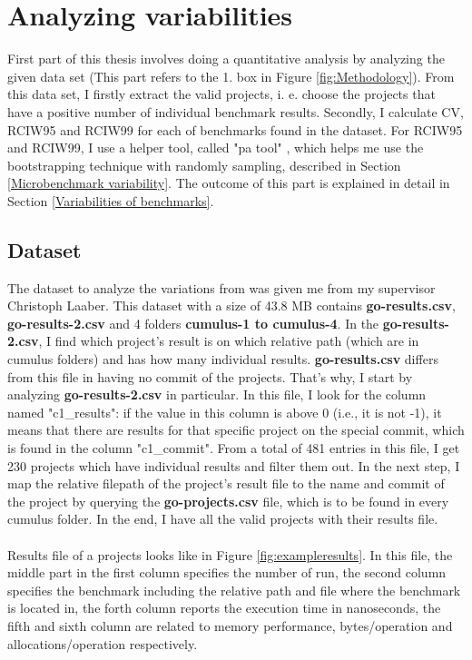 \documentclass{seal_thesis}
\begin{document}
\section{Analyzing variabilities}
\label{Analyzing variabilities}

First part of this thesis involves doing a quantitative analysis by analyzing the given data set (This part refers to the 1. box in Figure \ref{fig:Methodology}). From this data set, I firstly extract the valid projects, i. e. choose the projects that have a positive number of individual benchmark results. Secondly, I calculate CV, RCIW95 and RCIW99 for each of benchmarks found in the dataset. For RCIW95 and RCIW99, I use a helper tool, called "pa tool" \cite{patool}, which helps me use the bootstrapping technique with randomly sampling, described in Section \ref{Microbenchmark variability}. The outcome of this part is explained in detail in Section \ref{Variabilities of benchmarks}.

\subsection{Dataset}

The dataset to analyze the variations from was given me from my supervisor Christoph Laaber. This dataset with a size of 43.8 MB contains \textbf{go-results.csv}, \textbf{go-results-2.csv} and 4 folders \textbf{cumulus-1 to cumulus-4}. In the \textbf{go-results-2.csv}, I find which project's result is on which relative path (which are in cumulus folders) and has how many individual results. \textbf{go-results.csv} differs from this file in having no commit of the projects. That's why, I start by analyzing \textbf{go-results-2.csv} in particular. In this file, I look for the column named "c1\_results": if the value in this column is above 0 (i.e., it is not -1), it means that there are results for that specific project on the special commit, which is found in the column "c1\_commit". From a total of 481 entries in this file, I get 230 projects which have individual results and filter them out. In the next step, I map the relative filepath of the project's result file to the name and commit of the project by querying the \textbf{go-projects.csv} file, which is to be found in every cumulus folder. In the end, I have all the valid projects with their results file.\\
\\
Results file of a projects looks like in Figure \ref{fig:exampleresults}. In this file, the middle part in the first column specifies the number of run, the second column specifies the benchmark including the relative path and file where the benchmark is located in, the forth column reports the execution time in nanoseconds, the fifth and sixth column are related to memory performance, bytes/operation and allocations/operation respectively.
 
\end{document}
